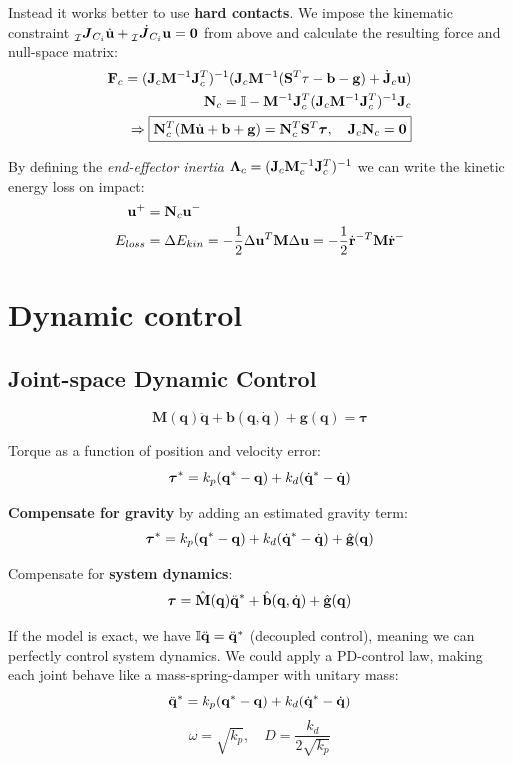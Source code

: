 \documentclass[a4paper, 8pt]{extarticle}
\newcommand{\mvec}[3]{  \prescript{}{\mathcal{#1}}{\bm{#2}}  _{#3} }
\newcommand{\mdvec}[3]{ \prescript{}{\mathcal{#1}}{\dot{\bm #2}} _{#3} }
\begin{document}
\begin{multicols*}{3}
Instead it works better to use {\bf hard contacts}. We impose the kinematic constraint $\mvec{I}{J}{C_i}\dot{\bf u} + \mdvec{I}{J}{C_i}{\bf u} = \bm 0$ from above and calculate the resulting force and null-space matrix:
\begin{align*}
{\bf F}_c = ({\bf J}_c{\bf M}^{-1}{\bf J}_c^T)^{-1} ({\bf J}_c{\bf M}^{-1} ({\bf S}^T {\bf \tau - b - g}) + \dot{\bf J}_c{\bf u})\\
{\bf N}_c = \mathbb{I} - {\bf M}^{-1}{\bf J}_c^T({\bf J}_c{\bf M}^{-1}{\bf J}_c^T)^{-1}{\bf J}_c \\
\Rightarrow \boxed{   
{\bf N}_c^T({\bf M}\dot{\bf u} + {\bf b + g}) = {\bf N}^T_c {\bf S}^T {\bm \tau}, \quad {\bf J}_c{\bf N}_c = {\bf 0}  }
\end{align*}

By defining the \emph{end-effector inertia} $\bm\Lambda_c = ({\bf J}_c{\bf M}_c^{-1}{\bf J}_c^T)^{-1}$ we can write the kinetic energy loss on impact:
\begin{align*}
{\bf u}^+ &= {\bf N}_c{\bf u}^-\\
E_{loss} &= \Delta E_{kin} = - \frac 12 \Delta{\bf u}^T{\bf M}\Delta{\bf u} = - \frac 12 \dot{\bf r}^{-T}{\bf M}\dot{\bf r}^{-}
\end{align*}


\section{Dynamic control}

\subsection{Joint-space Dynamic Control}
$$\boxed{\mathbf{ M(q)\ddot{q} + b(q,\dot q) + g(q)} = 
\bm\tau}$$

Torque as a function of position and velocity error:
$${\bm \tau}^* = k_p({\bf q}^* - {\bf q}) + k_d(\dot{\bf q}^* - \dot{\bf q})$$

\textbf{Compensate for gravity} by adding an estimated gravity term:
$${\bm \tau}^* = k_p({\bf q}^* - {\bf q}) + k_d(\dot{\bf q}^* - \dot{\bf q}) + \hat{\bf g}({\bf q})$$

Compensate for \textbf{system dynamics}:
$$\bm\tau = \hat{\bf M}({\bf q})\ddot{\bf q}^* + \hat{\bf b}({\bf q}, \dot{\bf q}) + \hat{\bf g}({\bf q})$$

If the model is exact, we have $\mathbb{I}\ddot{\bf q} = \ddot{\bf q}^*$ (decoupled control), meaning we can perfectly control system dynamics. We could apply a PD-control law, making each joint behave like a mass-spring-damper with unitary mass:
$$\ddot{\bf q}^* = k_p({\bf q}^* - {\bf q}) + k_d(\dot{\bf q}^* - \dot{\bf q})$$
$$\omega = \sqrt{k_p}, \quad D = \frac{k_d}{2\sqrt{k_p}}$$


\end{multicols*}
\end{document}
